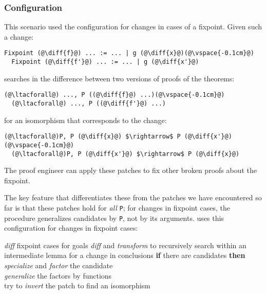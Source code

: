 \subsubsection{Configuration}

This scenario used the configuration for changes in cases of a fixpoint.
Given such a change:

\begin{lstlisting}[language=coq]
  Fixpoint (@\diff{f}@) ... := ... | g (@\diff{x}@)(@\vspace{-0.1cm}@)
  Fixpoint (@\diff{f'}@) ... := ... | g (@\diff{x'}@)
\end{lstlisting}
\sysname searches in the difference between two versions of proofs of the theorems:

\begin{lstlisting}[language=coq]
  (@\ltacforall@) ..., P ((@\diff{f}@) ...)(@\vspace{-0.1cm}@)
  (@\ltacforall@) ..., P ((@\diff{f'}@) ...)
\end{lstlisting}
for an isomorphism that corresponds to the change:

\begin{lstlisting}[language=coq]
  (@\ltacforall@)P, P (@\diff{x}@) $\rightarrow$ P (@\diff{x'}@)(@\vspace{-0.1cm}@)
  (@\ltacforall@)P, P (@\diff{x'}@) $\rightarrow$ P (@\diff{x}@)
\end{lstlisting}
The proof engineer can apply these patches to fix other broken proofs about the fixpoint.

The key feature that differentiates these from the patches we have encountered so far is that
these patches hold for \emph{all} \lstinline{P}; for changes in fixpoint cases, the procedure generalizes
candidates by \lstinline{P}, not by its arguments.
\sysname uses this configuration for changes in fixpoint cases:

\begin{algorithm}
\footnotesize
\begin{algorithmic}[1]
    \STATE \textit{diff} fixpoint cases for goals
    \STATE \textit{diff} and \textit{transform} to recursively search within an intermediate lemma for a change in conclusions
    \STATE \textbf{if} there are candidates \textbf{then}
    \STATE \hspace*{1em} \textit{specialize} and \textit{factor} the candidate \\
           \hspace*{1em} \textit{generalize} the factors by functions \\
           \hspace*{1em} try to \textit{invert} the patch to find an isomorphism 
\end{algorithmic}
\end{algorithm}


